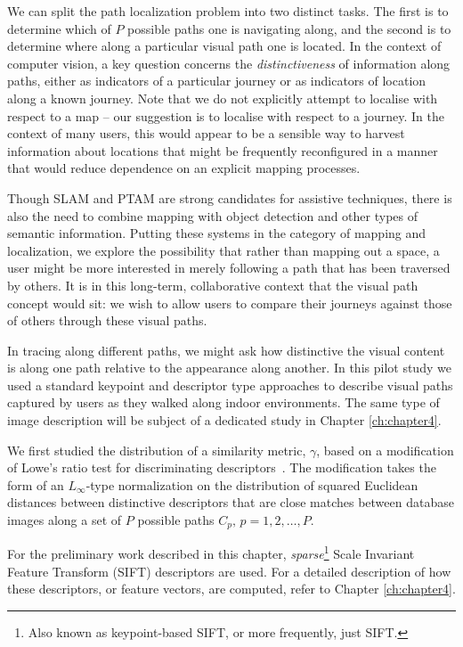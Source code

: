 We can split the path localization problem into two distinct tasks.  The first is to determine which of $P$ possible paths one is navigating along, and the second is to determine where along a particular visual path one is located.  In the context of computer vision, a key question concerns the \textit{distinctiveness} of information along paths, either as indicators of a particular journey or as indicators of location along a known journey.  Note that we do not explicitly attempt to localise with respect to a map -- our suggestion is to localise with respect to a journey.  In the context of many users, this would appear to be a sensible way to harvest information about locations that might be frequently reconfigured in a manner that would reduce dependence on an explicit mapping processes.

Though SLAM and PTAM are strong candidates for assistive techniques, there is also the need to combine mapping with object detection and other types of semantic information.  Putting these systems in the category of mapping and localization, we explore the possibility that rather than mapping out a space, a user might be more interested in merely following a path that has been traversed by others.  It is in this long-term, collaborative context that the visual path concept would sit: we wish to allow users to compare their journeys against those of others through these visual paths.

In tracing along different paths, we might ask how distinctive the visual content is along one path relative to the appearance along another. In this pilot study we used a standard keypoint and descriptor type approaches to describe visual paths captured by users as they walked along indoor environments. The same type of image description will be subject of a dedicated study in Chapter \ref{ch:chapter4}.

We first studied the distribution of a similarity metric, $\gamma$, based on a modification of Lowe's ratio test for discriminating descriptors~\cite{Lowe2004}. The modification takes the form of an $L_{\infty}$-type normalization on the distribution of squared Euclidean distances between distinctive descriptors that are close matches between database images along a set of $P$ possible paths $C_p,\,p=1,2,\ldots, P$.

For the preliminary work described in this chapter, \textit{sparse}\footnote{Also known as keypoint-based SIFT, or more frequently, just SIFT.} Scale Invariant Feature Transform (SIFT) descriptors are used. For a detailed description of how these descriptors, or feature vectors, are computed, refer to Chapter \ref{ch:chapter4}.


